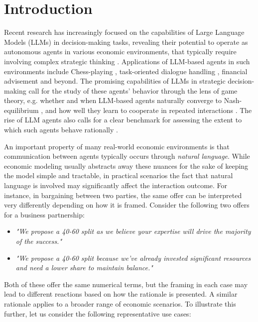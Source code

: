 \section{Introduction} \label{sec:introduction}
Recent research has increasingly focused on the capabilities of Large Language Models (LLMs) in decision-making tasks, revealing their potential to operate as autonomous agents in various economic environments, that typically require involving complex strategic thinking \cite{horton2023large,wang2023voyager,zhu2024capturing,li2024stridetoolassistedllmagent,sun2025game}. Applications of LLM-based agents in such environments include Chess-playing \cite{feng2024chessgpt}, task-oriented dialogue handling \cite{ulmer2024bootstrapping}, financial advisement \cite{lakkaraju2023llms} and beyond. The promising capabilities of LLMs in strategic decision-making call for the study of these agents' behavior through the lens of game theory, e.g. whether and when LLM-based agents naturally converge to Nash-equilibrium \cite{guo2024economics}, and how well they learn to cooperate in repeated interactions \cite{akata2023playing}. The rise of LLM agents also calls for a clear benchmark for assessing the extent to which such agents behave rationally \cite{ramansteer}.

An important property of many real-world economic environments is that communication between agents typically occurs through \emph{natural language}. While economic modeling usually abstracts away these nuances for the sake of keeping the model simple and tractable, in practical scenarios the fact that natural language is involved may significantly affect the interaction outcome. 
For instance, in bargaining between two parties, the same offer can be interpreted very differently depending on how it is framed. Consider the following two offers for a business partnership:

\begin{itemize}
    \item[(a)] \emph{"We propose a 40-60 split as we believe your expertise will drive the majority of the success."}
    \item[(b)] \emph{"We propose a 40-60 split because we’ve already invested significant resources and need a lower share to maintain balance."}
\end{itemize}

Both of these offer the same numerical terms, but the framing in each case may lead to different reactions based on how the rationale is presented.
A similar rationale applies to a broader range of economic scenarios. To illustrate this further, let us consider the following representative use cases:

